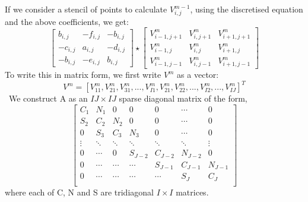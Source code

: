 \documentclass{article}
\begin{document}
\begin{enumerate}
If we consider a stencil of points to calculate $V^{m-1}_{i,j}$, using the discretised equation and the above coefficients, we get:
\[
\begin{bmatrix}
b_{i,j} & -f_{i,j} & -b_{i,j}\\
-c_{i,j}&a_{i,j}&-d_{i,j}\\
-b_{i,j}&-e_{i,j}&b_{i,j}
\end{bmatrix}
\star
\begin{bmatrix}
V^m_{i-1,j+1} &V^m_{i,j+1} & V^m_{i+1,j+1}\\
V^m_{i-1,j}&V^m_{i,j}&V^m_{i+1,j}\\
V^m_{i-1,j-1}&V^m_{i,j-1}&V^m_{i+1,j-1}
\end{bmatrix}
\] 
To write this in matrix form, we first write $V^m$ as a vector:
\[V^m=[V^m_{11},V^m_{21},V^m_{31},...,V^m_{I1},V^m_{21},V^m_{22},...,V^m_{I2},...,V^m_{IJ}]^T\]\
We construct A as an $IJ \times IJ$ sparse diagonal matrix of the form,
\[\begin{bmatrix}
C_1 & N_1 & 0 & 0 &0&\cdots&0 \\
S_2 & C_2 & N_2 & 0 &0&\cdots&0 \\
0 & S_3 & C_3 & N_3 &0&\cdots&0 \\
\vdots & \ddots & \ddots & \ddots & \ddots&\ddots&\vdots \\
0&\cdots&0&S_{J-2}&C_{J-2}&N_{J-2}&0 \\
0&\cdots&\cdots&\cdots&S_{J-1}&C_{J-1}&N_{J-1}\\
0&\cdots&\cdots&\cdots&\cdots&S_{J}&C_{J}\\
\end{bmatrix}\] 
where each of C, N and S are tridiagonal $I \times I$ matrices. \\


\end{enumerate}
\end{document}
